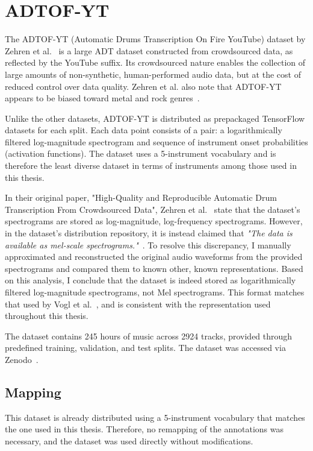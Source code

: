 \section{ADTOF-YT}

The ADTOF-YT (Automatic Drums Transcription On Fire YouTube) dataset by Zehren et al.~\cite{signals4040042} is a large \gls{ADT} dataset constructed from crowdsourced data, as reflected by the YouTube suffix. Its crowdsourced nature enables the collection of large amounts of non-synthetic, human-performed audio data, but at the cost of reduced control over data quality. Zehren et al. also note that ADTOF-YT appears to be biased toward metal and rock genres~\cite{signals4040042}.

Unlike the other datasets, ADTOF-YT is distributed as prepackaged TensorFlow datasets for each split. Each data point consists of a pair: a logarithmically filtered log-magnitude spectrogram and sequence of instrument onset probabilities (activation functions). The dataset uses a 5-instrument vocabulary and is therefore the least diverse dataset in terms of instruments among those used in this thesis.

In their original paper, "High-Quality and Reproducible Automatic Drum Transcription From Crowdsourced Data", Zehren et al.~\cite{signals4040042} state that the dataset's spectrograms are stored as log-magnitude, log-frequency spectrograms. However, in the dataset's distribution repository, it is instead claimed that \textit{"The data is available as mel-scale spectrograms."}~\cite{zehren_2023_10084511}. To resolve this discrepancy, I manually approximated and reconstructed the original audio waveforms from the provided spectrograms and compared them to known other, known representations. Based on this analysis, I conclude that the dataset is indeed stored as logarithmically filtered log-magnitude spectrograms, not Mel spectrograms. This format matches that used by Vogl et al.~\cite{Vogl2017DrumTV}, and is consistent with the representation used throughout this thesis.

The dataset contains 245 hours of music across 2924 tracks, provided through predefined training, validation, and test splits. The dataset was accessed via Zenodo~\cite{zehren_2023_10084511, signals4040042}.

\subsection{Mapping}

This dataset is already distributed using a 5-instrument vocabulary that matches the one used in this thesis. Therefore, no remapping of the annotations was necessary, and the dataset was used directly without modifications.


